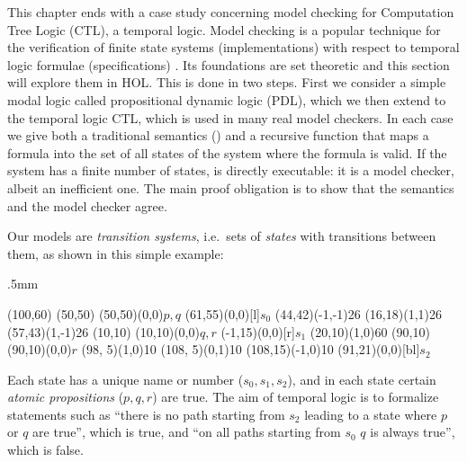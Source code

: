 %
\begin{isabellebody}%
\def\isabellecontext{Base}%
%
%
\begin{isamarkuptext}%
\label{sec:VMC}
This chapter ends with a case study concerning model checking for 
Computation Tree Logic (CTL), a temporal logic.
Model checking is a popular technique for the verification of finite
state systems (implementations) with respect to temporal logic formulae
(specifications) \cite{ClarkeGP-book,Huth-Ryan-book}. Its foundations are set theoretic
and this section will explore them in HOL\@. This is done in two steps.  First
we consider a simple modal logic called propositional dynamic
logic (PDL), which we then extend to the temporal logic CTL, which is
used in many real
model checkers. In each case we give both a traditional semantics (\isa{{\isasymTurnstile}}) and a
recursive function  that maps a formula into the set of all states of
the system where the formula is valid. If the system has a finite number of
states,  is directly executable: it is a model checker, albeit an
inefficient one. The main proof obligation is to show that the semantics
and the model checker agree.

\underscoreon

Our models are \emph{transition systems}, i.e.\ sets of \emph{states} with
transitions between them, as shown in this simple example:
\begin{center}
\unitlength.5mm
\thicklines
\begin{picture}(100,60)
\put(50,50){}
\put(50,50){\makebox(0,0){$p,q$}}
\put(61,55){\makebox(0,0)[l]{$s_0$}}
\put(44,42){\vector(-1,-1){26}}
\put(16,18){\vector(1,1){26}}
\put(57,43){\vector(1,-1){26}}
\put(10,10){}
\put(10,10){\makebox(0,0){$q,r$}}
\put(-1,15){\makebox(0,0)[r]{$s_1$}}
\put(20,10){\vector(1,0){60}}
\put(90,10){}
\put(90,10){\makebox(0,0){$r$}}
\put(98, 5){\line(1,0){10}}
\put(108, 5){\line(0,1){10}}
\put(108,15){\vector(-1,0){10}}
\put(91,21){\makebox(0,0)[bl]{$s_2$}}
\end{picture}
\end{center}
Each state has a unique name or number ($s_0,s_1,s_2$), and in each
state certain \emph{atomic propositions} ($p,q,r$) are true.
The aim of temporal logic is to formalize statements such as ``there is no
path starting from $s_2$ leading to a state where $p$ or $q$
are true'', which is true, and ``on all paths starting from $s_0$ $q$ is always true'',
which is false.


\end{isamarkuptext}
\end{isabellebody}

